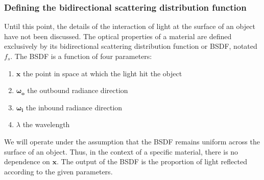 \documentclass[12pt]{article}
\begin{document}
\subsubsection{Defining the bidirectional scattering distribution function}
Until this point, the details of the interaction of light at the surface of an object have not been discussed.
The optical properties of a material are defined exclusively by its bidirectional scattering distribution function or BSDF, notated \(f_s\).
The BSDF is a function of four parameters:
\begin{enumerate}
\item \(\mathbf x\) the point in space at which the light hit the object
\item \(\bm{\omega_o}\) the outbound radiance direction
\item \(\bm{\omega_i}\) the inbound radiance direction
\item \(\lambda\) the wavelength
\end{enumerate}
We will operate under the assumption that the BSDF remains uniform across the surface of an object.
Thus, in the context of a specific material, there is no dependence on \(\mathbf x\).
The output of the BSDF is the proportion of light reflected according to the given parameters.
\end{document}
